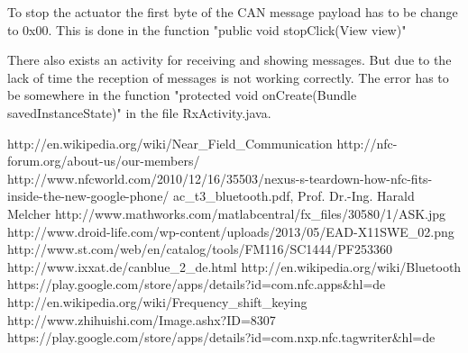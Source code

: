 \documentclass[11pt]{article}
\begin{document}
To stop the actuator the first byte of the CAN message payload has to be change to 0x00. This is done in the function "public void stopClick(View view)"


There also exists an activity for receiving and showing messages. But due to the lack of time the reception of messages is not working correctly. The error has to be somewhere in the function "protected void onCreate(Bundle savedInstanceState)" in the file RxActivity.java.

\newpage
\begin{thebibliography}{99} %

 http://en.wikipedia.org/wiki/Near\_Field\_Communication
 http://nfc-forum.org/about-us/our-members/
 http://www.nfcworld.com/2010/12/16/35503/nexus-s-teardown-how-nfc-fits-inside-the-new-google-phone/
 ac\_t3\_bluetooth.pdf, Prof. Dr.-Ing. Harald Melcher
 http://www.mathworks.com/matlabcentral/fx\_files/30580/1/ASK.jpg
 http://www.droid-life.com/wp-content/uploads/2013/05/EAD-X11SWE\_02.png
 http://www.st.com/web/en/catalog/tools/FM116/SC1444/PF253360
 http://www.ixxat.de/canblue\_2\_de.html
 http://en.wikipedia.org/wiki/Bluetooth
 https://play.google.com/store/apps/details?id=com.nfc.apps\&hl=de
 http://en.wikipedia.org/wiki/Frequency\_shift\_keying
 http://www.zhihuishi.com/Image.ashx?ID=8307
 https://play.google.com/store/apps/details?id=com.nxp.nfc.tagwriter\&hl=de


\end{thebibliography}


\end{document}
